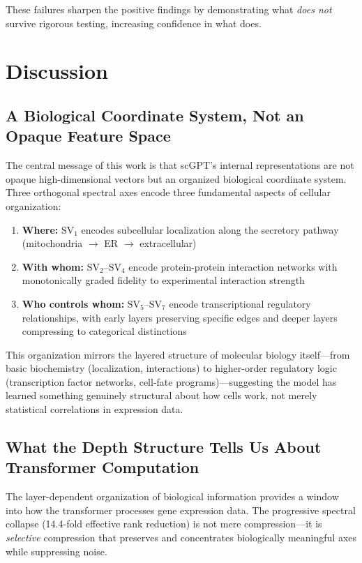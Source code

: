 \documentclass[10pt,twocolumn]{article}
\newcommand{\SV}[1]{\mathrm{SV}_{#1}}
\begin{document}
These failures sharpen the positive findings by demonstrating what \emph{does not} survive rigorous testing, increasing confidence in what does.

\section{Discussion}

\subsection{A Biological Coordinate System, Not an Opaque Feature Space}

The central message of this work is that scGPT's internal representations are not opaque high-dimensional vectors but an organized biological coordinate system.
Three orthogonal spectral axes encode three fundamental aspects of cellular organization:
\begin{enumerate}
  \item \textbf{Where:} $\SV{1}$ encodes subcellular localization along the secretory pathway (mitochondria $\to$ ER $\to$ extracellular)
  \item \textbf{With whom:} $\SV{2}$--$\SV{4}$ encode protein-protein interaction networks with monotonically graded fidelity to experimental interaction strength
  \item \textbf{Who controls whom:} $\SV{5}$--$\SV{7}$ encode transcriptional regulatory relationships, with early layers preserving specific edges and deeper layers compressing to categorical distinctions
\end{enumerate}

This organization mirrors the layered structure of molecular biology itself---from basic biochemistry (localization, interactions) to higher-order regulatory logic (transcription factor networks, cell-fate programs)---suggesting the model has learned something genuinely structural about how cells work, not merely statistical correlations in expression data.

\subsection{What the Depth Structure Tells Us About Transformer Computation}

The layer-dependent organization of biological information provides a window into how the transformer processes gene expression data.
The progressive spectral collapse (14.4-fold effective rank reduction) is not mere compression---it is \emph{selective} compression that preserves and concentrates biologically meaningful axes while suppressing noise.
\end{document}
